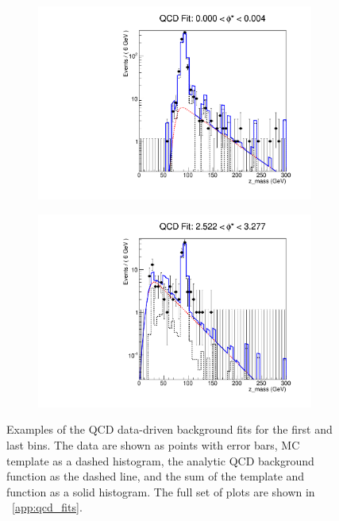 \begin{figure}[!htbp]
    \centering
    \begin{subfigure}[b]{0.5\textwidth}
        \includegraphics[width=\linewidth]{figures/qcd_fits/qcd_fit_plot_for_01.pdf}
        \caption{}
        \label{fig:qcd_fit_example_01}
    \end{subfigure}%
    \begin{subfigure}[b]{0.5\textwidth}
        \includegraphics[width=\linewidth]{figures/qcd_fits/qcd_fit_plot_for_34.pdf}
        \caption{}
        \label{fig:qcd_fit_example_34}
    \end{subfigure}
    \caption[
       Examples of the QCD data-driven background fits.
    ]{
       Examples of the QCD data-driven background fits for the first and last
       \phistar bins. The data are shown as points with error bars, MC template
       as a dashed histogram, the analytic QCD background function as the
       dashed line, and the sum of the template and function as a solid
       histogram. The full set of plots are shown in \APP~\ref{app:qcd_fits}.
    }
    \label{fig:qcd_example_fits}
\end{figure}
